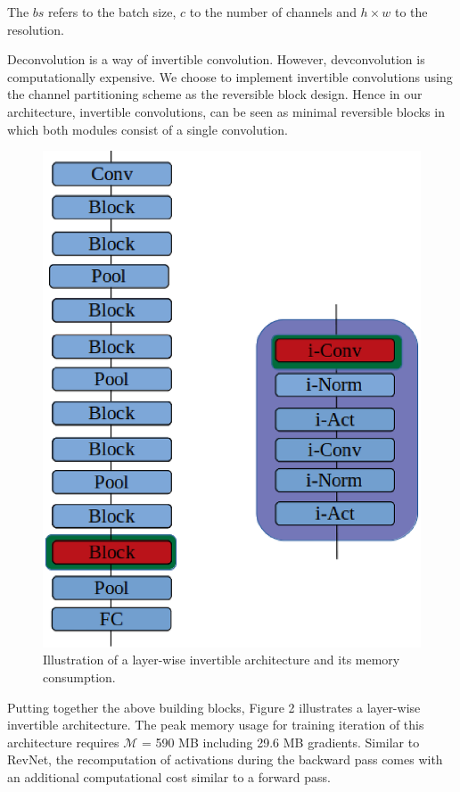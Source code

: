 \documentclass[10pt,twocolumn,letterpaper]{article}
\begin{document}
The $bs$ refers to the batch size, $c$ to the number of channels and $h \times w$ to the resolution.

Deconvolution is a way of invertible convolution. However, devconvolution is computationally expensive. We choose to implement invertible convolutions using the channel partitioning scheme as the reversible block design. Hence in our architecture, invertible convolutions, can be seen as minimal reversible blocks in which both modules consist of a single convolution.
\begin{figure}[h]
\begin{center}
\includegraphics[height=0.5\linewidth]{Figure2.eps}
\end{center}
   \caption{Illustration of a layer-wise invertible architecture and
its memory consumption.}
\end{figure}

Putting together the above building blocks, Figure 2 illustrates a layer-wise invertible architecture. The peak memory usage for training iteration of this architecture requires $\mathcal{M}$ = 590 MB including 29.6 MB gradients. Similar to RevNet, the recomputation of activations during the backward pass comes with an additional computational cost similar to a forward pass.
\end{document}
